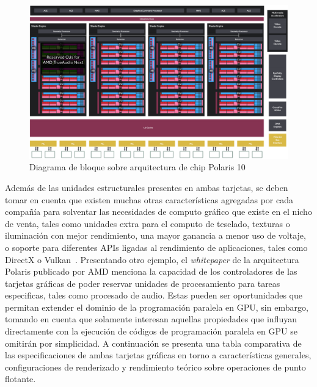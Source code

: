 \begin{figure}[h!]
    \centering
    \includegraphics[width=.8\textwidth]{Figures/amd.png}
    \caption{Diagrama de bloque sobre arquitectura de chip Polaris 10}
    \label{fig:7}
\end{figure}

Además de las unidades estructurales presentes en ambas tarjetas, se deben tomar en cuenta que existen muchas otras características agregadas por cada compañía para solventar las necesidades de computo gráfico que existe en el nicho de venta, tales como unidades extra para el computo de teselado, texturas o iluminación con mejor rendimiento, una mayor ganancia a menor uso de voltaje, o soporte para diferentes APIs ligadas al rendimiento de aplicaciones, tales como DirectX o Vulkan~\cite{directx, vulkan}.
Presentando otro ejemplo, el \textit{whitepaper} de la arquitectura Polaris publicado por AMD menciona la capacidad de los controladores de las tarjetas gráficas de poder reservar unidades de procesamiento para tareas especificas, tales como procesado de audio.
Estas pueden ser oportunidades que permitan extender el dominio de la programación paralela en GPU, sin embargo, tomando en cuenta que solamente interesan aquellas propiedades que influyan directamente con la ejecución de códigos de programación paralela en GPU se omitirán por simplicidad. 
A continuación se presenta una tabla comparativa de las especificaciones de ambas tarjetas gráficas en torno a características generales, configuraciones de renderizado y rendimiento teórico sobre operaciones de punto flotante.

